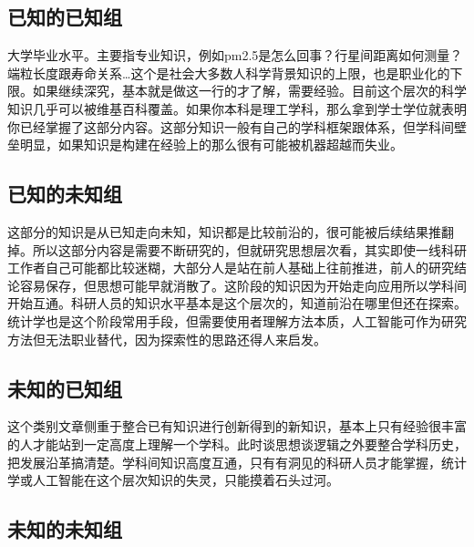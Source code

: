 \documentclass[]{tufte-book}
\begin{document}
\hypertarget{ux5df2ux77e5ux7684ux5df2ux77e5ux7ec4}{%
\subsection{已知的已知组}\label{ux5df2ux77e5ux7684ux5df2ux77e5ux7ec4}}

大学毕业水平。主要指专业知识，例如pm2.5是怎么回事？行星间距离如何测量？端粒长度跟寿命关系\ldots{}这个是社会大多数人科学背景知识的上限，也是职业化的下限。如果继续深究，基本就是做这一行的才了解，需要经验。目前这个层次的科学知识几乎可以被维基百科覆盖。如果你本科是理工学科，那么拿到学士学位就表明你已经掌握了这部分内容。这部分知识一般有自己的学科框架跟体系，但学科间壁垒明显，如果知识是构建在经验上的那么很有可能被机器超越而失业。

\hypertarget{ux5df2ux77e5ux7684ux672aux77e5ux7ec4}{%
\subsection{已知的未知组}\label{ux5df2ux77e5ux7684ux672aux77e5ux7ec4}}

这部分的知识是从已知走向未知，知识都是比较前沿的，很可能被后续结果推翻掉。所以这部分内容是需要不断研究的，但就研究思想层次看，其实即使一线科研工作者自己可能都比较迷糊，大部分人是站在前人基础上往前推进，前人的研究结论容易保存，但思想可能早就消散了。这阶段的知识因为开始走向应用所以学科间开始互通。科研人员的知识水平基本是这个层次的，知道前沿在哪里但还在探索。统计学也是这个阶段常用手段，但需要使用者理解方法本质，人工智能可作为研究方法但无法职业替代，因为探索性的思路还得人来启发。

\hypertarget{ux672aux77e5ux7684ux5df2ux77e5ux7ec4}{%
\subsection{未知的已知组}\label{ux672aux77e5ux7684ux5df2ux77e5ux7ec4}}

这个类别文章侧重于整合已有知识进行创新得到的新知识，基本上只有经验很丰富的人才能站到一定高度上理解一个学科。此时谈思想谈逻辑之外要整合学科历史，把发展沿革搞清楚。学科间知识高度互通，只有有洞见的科研人员才能掌握，统计学或人工智能在这个层次知识的失灵，只能摸着石头过河。

\hypertarget{ux672aux77e5ux7684ux672aux77e5ux7ec4}{%
\subsection{未知的未知组}\label{ux672aux77e5ux7684ux672aux77e5ux7ec4}}
\end{document}
